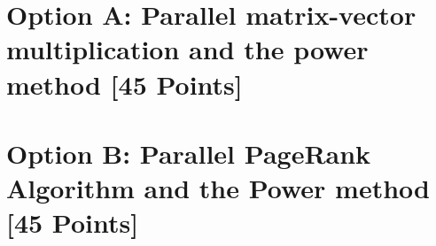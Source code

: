 \documentclass[unicode,11pt,a4paper,oneside,numbers=endperiod,openany]{scrartcl}
\begin{document}
\section{Option A: Parallel matrix-vector multiplication and the power method [45 Points]}





\section{Option B: Parallel PageRank Algorithm and the Power method  [45 Points]}




\label{lastpage}
\end{document}
